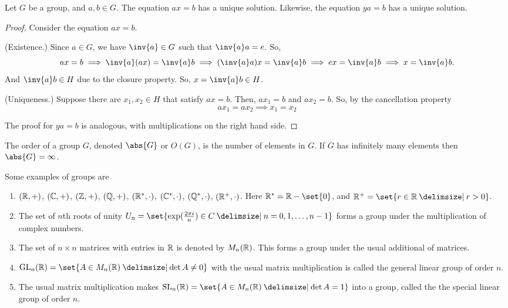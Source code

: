 \documentclass[11pt]{penrose}
\newcommand{\keyword}[1]{\textsf{#1}}
\begin{document}
\begin{nthm}
    Let $G$ be a group, and $a, b \in G$. The equation $a x = b$ has a unique solution. Likewise, the equation $y a = b$ has a unique solution.
\end{nthm}
\begin{proof}
    Consider the equation $a x = b$.

    (Existence.) Since $a \in G$, we have $\inv{a} \in G$ such that $\inv{a} a = e$. So,
    \begin{equation*}
        ax = b
        \implies \inv{a} (a x) = \inv{a} b
        \implies (\inv{a} a) x = \inv{a} b
        \implies e x = \inv{a} b
        \implies x = \inv{a} b.
    \end{equation*}
    And $\inv{a} b \in H$ due to the closure property. So, $x = \inv{a} b \in H$.

    (Uniqueness.) Suppose there are $x_1, x_2 \in H$ that satisfy $a x = b$. Then, $a x_1 = b$ and $a x_2 = b$. So, by the cancellation property
    \begin{equation*}
        a x_1 = a x_2
        \implies x_1 = x_2
    \end{equation*}
    
    The proof for $y a = b$ is analogous, with multiplications on the right hand side.
\end{proof}

\begin{ndfn}
    The \keyword{order} of a group $G$, denoted $\abs{G}$ or $O(G)$, is the number of elements in $G$. If $G$ has infinitely many elements then $\abs{G} = \infty$.
\end{ndfn}

\begin{egg}
    Some examples of groups are
    \begin{enumerate}
        \item $(\mathbb{R},+)$, $(\mathbb{C},+)$, $(\mathbb{Z},+)$, $(\mathbb{Q},+)$, $(\mathbb{R}^{*},\cdot)$, $(\mathbb{C}^{*},\cdot)$, $(\mathbb{Q}^{*},\cdot)$, $(\mathbb{R}^{+},\cdot)$. Here $\R^{*} = \R - \set{0}$, and $\R^{+} = \set{r \in \R \st r > 0}$.
        \item The set of $n$th roots of unity $U_n = \set{\exp(\frac{2\pi i}{n}) \in C \st n = 0, 1, \dots, n-1}$ forms a group under the multiplication of complex numbers.
        \item The set of $n \times n$ matrices with entries in $\mathbb{R}$ is denoted by $M_{n}(\mathbb{R})$. This forms a group under the usual additional of matrices.
        \item $\GL_{n}(\R) = \set{A \in M_{n}(\R) \st \det A \neq 0}$ with the usual matrix multiplication is called the \keyword{general linear group} of order $n$.
        \item The usual matrix multiplication makes $\SL_{n}(\R) = \set{A \in M_{n}(\R) \st \det A = 1}$ into a group, called the the \keyword{special linear group} of order $n$.
    \end{enumerate}
\end{egg}
\end{document}
